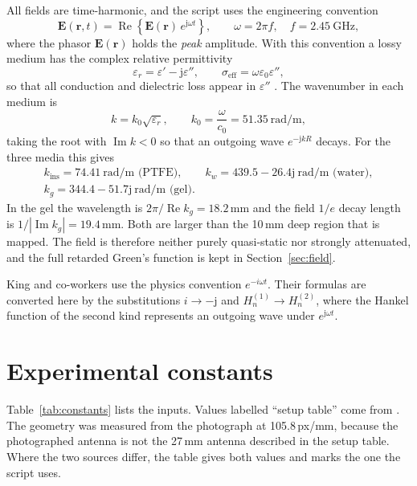 \documentclass[11pt,a4paper]{article}
\newcommand{\eps}{\varepsilon}
\newcommand{\jj}{\mathrm{j}}
\begin{document}
All fields are time-harmonic, and the script uses the engineering convention
\begin{equation}
  \mathbf{E}(\mathbf{r},t) = \operatorname{Re}\!\left\{\mathbf{E}(\mathbf{r})\,e^{\jj\omega t}\right\},
  \qquad \omega = 2\pi f,\quad f = 2.45\ \text{GHz},
\end{equation}
where the phasor $\mathbf{E}(\mathbf{r})$ holds the \emph{peak} amplitude. With this convention a lossy
medium has the complex relative permittivity
\begin{equation}
  \eps_r = \eps' - \jj\eps'', \qquad \sigma_{\text{eff}} = \omega\eps_0\eps'',
  \label{eq:complexeps}
\end{equation}
so that all conduction and dielectric loss appear in $\eps''$ \cite{Harrington1961}. The wavenumber in
each medium is
\begin{equation}
  k = k_0\sqrt{\eps_r}, \qquad k_0 = \frac{\omega}{c_0} = 51.35\ \text{rad/m},
  \label{eq:k}
\end{equation}
taking the root with $\operatorname{Im}k<0$ so that an outgoing wave $e^{-\jj kR}$ decays. For the three
media this gives
\begin{gather*}
  k_{\text{ins}} = 74.41\ \text{rad/m (PTFE)},\qquad
  k_w = 439.5-26.4\jj\ \text{rad/m (water)},\\
  k_g = 344.4-51.7\jj\ \text{rad/m (gel)}.
\end{gather*}
In the gel the wavelength is $2\pi/\operatorname{Re}k_g = 18.2$\,mm and the field $1/e$ decay length is
$1/|\operatorname{Im}k_g| = 19.4$\,mm. Both are larger than the 10\,mm deep region that is mapped. The field
is therefore neither purely quasi-static nor strongly attenuated, and the full retarded Green's function is
kept in Section~\ref{sec:field}.

King and co-workers \cite{King1983,KingSmith1981} use the physics convention $e^{-i\omega t}$. Their formulas
are converted here by the substitutions $i\to-\jj$ and $H^{(1)}_n\to H^{(2)}_n$, where the Hankel function
of the second kind represents an outgoing wave under $e^{\jj\omega t}$.

\section{Experimental constants}\label{sec:constants}

Table~\ref{tab:constants} lists the inputs. Values labelled ``setup table'' come from
. The geometry was measured from the photograph
 at 105.8\,px/mm, because the photographed antenna is not the 27\,mm
antenna described in the setup table. Where the two sources differ, the table gives both values and marks
the one the script uses.
\end{document}
